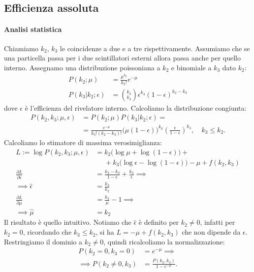 \documentclass[a4paper]{article}
\newcommand*\pdv[2]{\frac{\partial #1}{\partial #2}}
\begin{document}
\subsection*{Efficienza assoluta}

\paragraph{Analisi statistica}

Chiamiamo $k_2$, $k_3$ le coincidenze a due e a tre rispettivamente.
Assumiamo che se una particella passa per i due scintillatori esterni allora passa anche per quello interno.
Assegnamo una distribuzione poissoniana a $k_2$ e binomiale a $k_3$ dato $k_2$:
\begin{align*}
	P(k_2;\mu)
	&= \frac{\mu^{k_2}}{k_2!}e^{-\mu} \\
	P(k_3|k_2;\epsilon)
	&= \binom{k_2}{k_3} \epsilon^{k_3} (1-\epsilon)^{k_2-k_3}
\end{align*}
dove $\epsilon$ è l'efficienza del rivelatore interno.
Calcoliamo la distribuzione congiunta:
\begin{align*}
	P(k_2,k_3;\mu,\epsilon)
	&= P(k_2;\mu) P(k_3|k_2;\epsilon) = \\
	&= \frac{e^{-\mu}}{k_3!(k_2-k_3)!} \big(\mu(1-\epsilon)\big)^{k_2} \left(\frac\epsilon{1-\epsilon}\right)^{k_3},
	\quad k_3 \le k_2.
\end{align*}
Calcoliamo lo stimatore di massima verosimiglianza:
\begin{align*}
	L := \log P(k_2,k_3;\mu,\epsilon)
	&= k_2 \big( \log\mu + \log(1-\epsilon) \big) + {}\\
	&\phantom{{}={}}+ k_3 \big( \log\epsilon - \log(1-\epsilon) \big)
	- \mu + f(k_2,k_3) \\
	\pdv{L}{\epsilon}
	&= \frac{k_3-k_2}{1-\epsilon} + \frac{k_3}\epsilon \implies \\
	\implies \hat\epsilon
	&= \frac{k_3}{k_2} \\
	\pdv{L}{\mu}
	&= \frac{k_2}{\mu} - 1 \implies \\
	\implies \hat\mu
	&= k_2
\end{align*}
Il risultato è quello intuitivo.
Notiamo che $\hat\epsilon$ è definito per $k_2\neq 0$,
infatti per $k_2=0$, ricordando che $k_3\le k_2$, si ha
$L = -\mu + f(k_2,k_3)$ che non dipende da $\epsilon$.
Restringiamo il dominio a $k_2\neq 0$,
quindi ricalcoliamo la normalizzazione:
\begin{align*}
	P(k_2=0,k_3=0)
	&= e^{-\mu} \implies \\
	\implies P(k_2\neq 0,k_3)
	&= \frac{P(k_2,k_3)}{1-e^{-\mu}}.
\end{align*}
\end{document}

